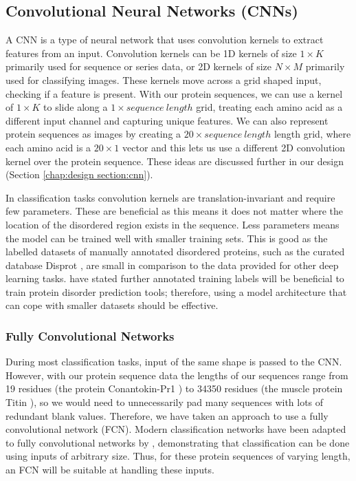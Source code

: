 \documentclass{l4proj}
\begin{document}
\subsection{Convolutional Neural Networks (CNNs)}
\label{chap:background sec:CNN}

A CNN is a type of neural network that uses convolution kernels to extract features from an input. Convolution kernels can be 1D kernels of size $1\times K$ primarily used for sequence or series data, or 2D kernels of size $N\times M$ primarily used for classifying images. These kernels move across a grid shaped input, checking if a feature is present. With our protein sequences, we can use a kernel of $1\times K$ to slide along a $1\times sequence\ length$ grid, treating each amino acid as a different input channel and capturing unique features. We can also represent protein sequences as images by creating a $20\times sequence\ length$ length grid, where each amino acid is a $20\times 1$ vector and this lets us use a different 2D convolution kernel over the protein sequence. These ideas are discussed further in our design (Section \ref{chap:design section:cnn}).

In classification tasks convolution kernels are translation-invariant and require few parameters. These are beneficial as this means it does not matter where the location of the disordered region exists in the sequence. Less parameters means the model can be trained well with smaller training sets. This is good as the labelled datasets of manually annotated disordered proteins, such as the curated database Disprot \citep{disprot}, are small in comparison to the data provided for other deep learning tasks. \cite{Jones:15} have stated further annotated training labels will be beneficial to train protein disorder prediction tools; therefore, using a model architecture that can cope with smaller datasets should be effective. \\

\subsubsection{Fully Convolutional Networks \newline}
\label{chap:background sec:FCN}

During most classification tasks, input of the same shape is passed to the CNN. However, with our protein sequence data the lengths of our sequences range from 19 residues (the protein Conantokin-Pr1 \citep{uniprot:22}) to 34350 residues (the muscle protein Titin \citep{uniprot:22}), so we would need to unnecessarily pad many sequences with lots of redundant blank values. Therefore, we have taken an approach to use a fully convolutional network (FCN). Modern classification networks have been adapted to fully convolutional networks by \cite{fcn_seg}, demonstrating that classification can be done using inputs of arbitrary size. Thus, for these protein sequences of varying length, an FCN will be suitable at handling these inputs. 
\end{document}
